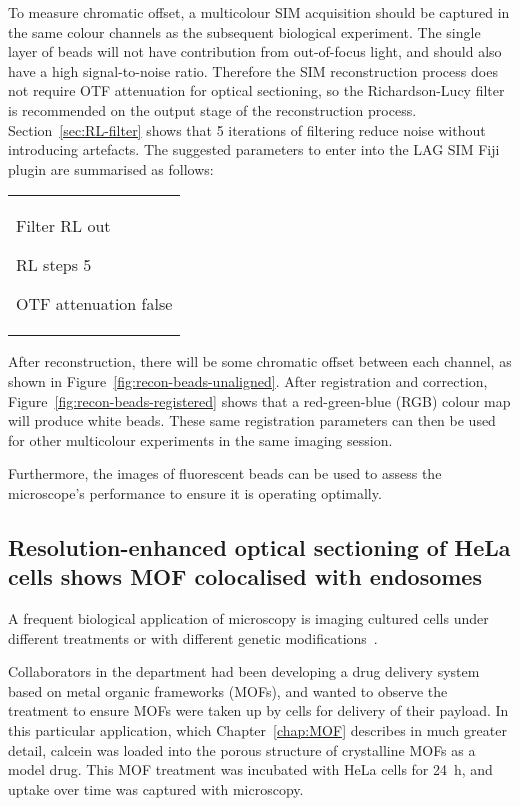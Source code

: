 To measure chromatic offset, a multicolour SIM acquisition should be captured in the same colour channels as the subsequent biological experiment.
The single layer of beads will not have contribution from out-of-focus light, and should also have a high signal-to-noise ratio.
Therefore the SIM reconstruction process does not require OTF attenuation for optical sectioning, so the Richardson-Lucy filter is recommended on the output stage of the reconstruction process.
Section~\ref{sec:RL-filter} shows that 5 iterations of filtering reduce noise without introducing artefacts.
The suggested parameters to enter into the LAG SIM Fiji plugin are summarised as follows: \newline
\begin{tabular}{p{}}
\begin{labelling}[margin=OTF attenuation]
	\item[Filter] RL out
	\item[RL steps] 5
	\item[OTF attenuation] false
\end{labelling}
\end{tabular}

After reconstruction, there will be some chromatic offset between each channel, as shown in Figure~\ref{fig:recon-beads-unaligned}.
After registration and correction, Figure~\ref{fig:recon-beads-registered} shows that a red-green-blue (RGB) colour map will produce white beads.
These same registration parameters can then be used for other multicolour experiments in the same imaging session.

Furthermore, the images of fluorescent beads can be used to assess the microscope's performance to ensure it is operating optimally. 


\subsection{Resolution-enhanced optical sectioning of HeLa cells shows MOF colocalised with endosomes} \label{sec:showcase-MOF}
A frequent biological application of microscopy is imaging cultured cells under different treatments or with different genetic modifications~\cite{white1987evaluation, specht2017critical, wang2017analysis}.

Collaborators in the department had been developing a drug delivery system based on metal organic frameworks (MOFs), and wanted to observe the treatment to ensure MOFs were taken up by cells for delivery of their payload.
In this particular application, which Chapter~\ref{chap:MOF} describes in much greater detail, calcein was loaded into the porous structure of crystalline MOFs as a model drug.
This MOF treatment was incubated with HeLa cells for \SI{24}{\hour}, and uptake over time was captured with microscopy.

